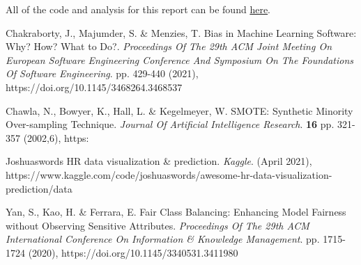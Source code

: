 All of the code and analysis for this report can be found \href{https://github.com/cas2247/RDS_Algorithmic_Fairness}{here}.


\begin{thebibliography}{9}




Chakraborty, J., Majumder, S. \& Menzies, T. Bias in Machine Learning Software: Why? How? What to Do?. {\em Proceedings Of The 29th ACM Joint Meeting On European Software Engineering Conference And Symposium On The Foundations Of Software Engineering}. pp. 429-440 (2021), https://doi.org/10.1145/3468264.3468537


Chawla, N., Bowyer, K., Hall, L. \& Kegelmeyer, W. SMOTE: Synthetic Minority Over-sampling Technique. {\em Journal Of Artificial Intelligence Research}. \textbf{16} pp. 321-357 (2002,6), https:%

Joshuaswords HR data visualization \& prediction. {\em Kaggle}. (April 2021), https://www.kaggle.com/code/joshuaswords/awesome-hr-data-visualization-prediction/data

Yan, S., Kao, H. \& Ferrara, E. Fair Class Balancing: Enhancing Model Fairness without Observing Sensitive Attributes. {\em Proceedings Of The 29th ACM International Conference On Information \& Knowledge Management}. pp. 1715-1724 (2020), https://doi.org/10.1145/3340531.3411980

\end{thebibliography}





